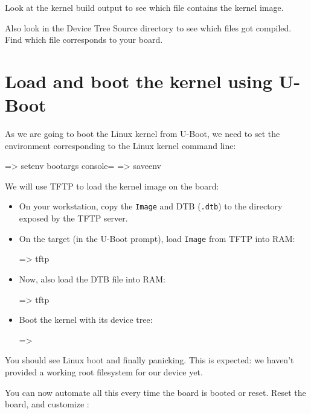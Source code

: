 Look at the kernel build output to see which file contains
the kernel image.

Also look in the Device Tree Source directory to see which 
files got compiled. Find which  file corresponds to your board.


\section{Load and boot the kernel using U-Boot}

As we are going to boot the Linux kernel from U-Boot,
we need to set the  environment corresponding
to the Linux kernel command line:

\begin{ubootinput}
=> setenv bootargs console=%
=> saveenv
\end{ubootinput}
We will use TFTP to load the kernel image on the board:

\begin{itemize}

\item On your workstation, copy the {\tt Image} and DTB
(\texttt{\dtname}\texttt{.dtb}) to the directory exposed by the TFTP server.

\item On the target (in the U-Boot prompt), load {\tt Image} from
TFTP into RAM:
\begin{ubootinput}
=> tftp %
\end{ubootinput}

\item Now, also load the DTB file into RAM:
\begin{ubootinput}
=> tftp %
\end{ubootinput}

\item Boot the kernel with its device tree:
\begin{ubootinput}
=> %
\end{ubootinput}

\end{itemize}

You should see Linux boot and finally panicking. This is expected: we
haven't provided a working root filesystem for our device yet.

You can now automate all this every time the board is booted or
reset. Reset the board, and customize :


